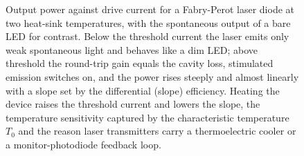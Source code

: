 \begin{figure}[htbp]
\caption[Light-current curve of a laser diode]{Output power against drive
current for a Fabry-Perot laser diode at two heat-sink temperatures, with the
spontaneous output of a bare LED for contrast. Below the threshold current the
laser emits only weak spontaneous light and behaves like a dim LED; above
threshold the round-trip gain equals the cavity loss, stimulated emission
switches on, and the power rises steeply and almost linearly with a slope set
by the differential (slope) efficiency. Heating the device raises the threshold
current and lowers the slope, the temperature sensitivity captured by the
characteristic temperature $T_0$ and the reason laser transmitters carry a
thermoelectric cooler or a monitor-photodiode feedback loop.}
\label{fig:vol04ch12:laser-pi-curve}
\end{figure}
